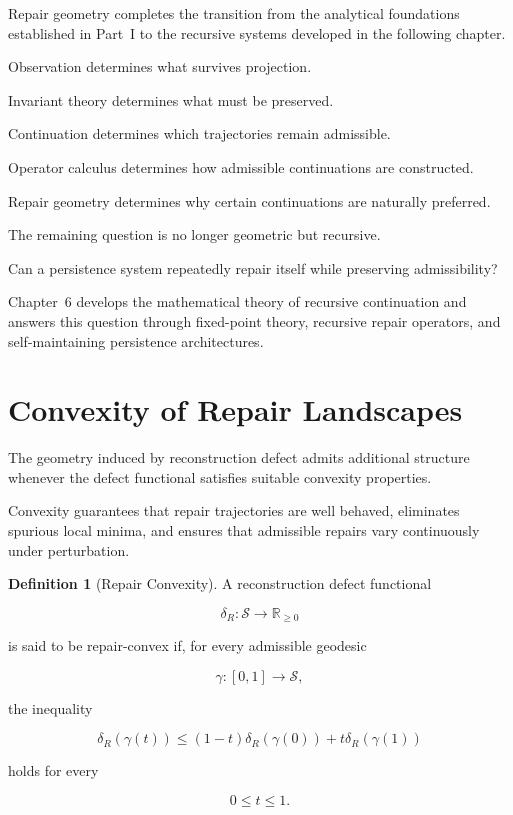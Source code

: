 \documentclass[11pt]{book}
\numberwithin{equation}{chapter}
\theoremstyle{definition}
\newtheorem{definition}{Definition}[chapter]
\theoremstyle{plain}
\begin{document}
Repair geometry completes the transition from the analytical
foundations established in Part~I to the recursive systems
developed in the following chapter.

Observation determines what survives projection.

Invariant theory determines what must be preserved.

Continuation determines which trajectories remain admissible.

Operator calculus determines how admissible continuations are
constructed.

Repair geometry determines why certain continuations are naturally
preferred.

The remaining question is no longer geometric but recursive.

Can a persistence system repeatedly repair itself while preserving
admissibility?

Chapter~6 develops the mathematical theory of recursive
continuation and answers this question through fixed-point theory,
recursive repair operators, and self-maintaining persistence
architectures.

\section{Convexity of Repair Landscapes}

The geometry induced by reconstruction defect admits additional
structure whenever the defect functional satisfies suitable convexity
properties.

Convexity guarantees that repair trajectories are well behaved,
eliminates spurious local minima, and ensures that admissible repairs
vary continuously under perturbation.

\begin{definition}[Repair Convexity]

A reconstruction defect functional

\[
\delta_R :
\mathcal S
\rightarrow
\mathbb R_{\ge0}
\]

is said to be repair-convex if, for every admissible geodesic

\[
\gamma:[0,1]\rightarrow\mathcal S,
\]

the inequality

\[
\delta_R(\gamma(t))
\le
(1-t)\delta_R(\gamma(0))
+
t\delta_R(\gamma(1))
\]

holds for every

\[
0\le t\le1.
\]

\end{definition}
\end{document}
